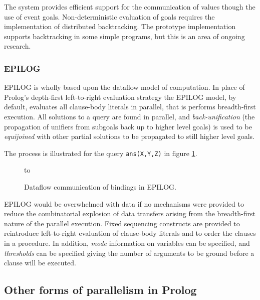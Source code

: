 The system provides efficient support for the communication of values though the
use of event goals.  Non-deterministic evaluation of goals requires the implementation
of distributed backtracking.  The prototype implementation  supports backtracking in
some simple programs, but this is an area of ongoing research.

\subsubsection{EPILOG}


EPILOG \cite{Wis86} is wholly based upon the dataflow model of computation.  In
place of Prolog's depth-first left-to-right evaluation strategy the EPILOG model,
by default, evaluates all clause-body literals in parallel, that is performs
breadth-first execution.  All solutions to a query are found in parallel, and
\textit{back-unification} (the propagation of unifiers from subgoals back up to higher
level goals) is used to be \textit{equijoined} with other partial solutions to be
propagated to still higher level goals.

The process is illustrated for the query \texttt{ans(X,Y,Z)} in figure \ref{epilog}.

\begin{figure}[h]
\vspace{5mm} \hbox to 
\caption{Dataflow communication of bindings in EPILOG.}
\vspace{5mm}
\label{epilog}
\end{figure}

EPILOG would be
overwhelmed with data if no mechanisms were provided
to reduce the combinatorial explosion of data transfers arising from
the breadth-first nature of the parallel execution.  Fixed sequencing constructs are
provided to reintroduce left-to-right evaluation of clause-body literals and to
order the clauses in a procedure.  In addition, \textit{mode} information on variables
can be specified, and \textit{thresholds} can be specified giving the number of
arguments to be ground before a clause will be executed.

\subsection{Other forms of parallelism in Prolog}

